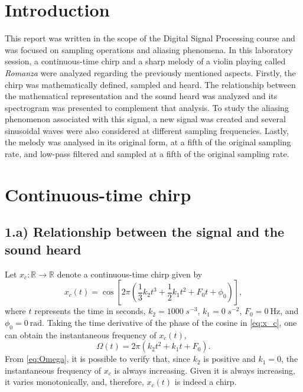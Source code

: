 \documentclass[a4paper, oneside, 11pt]{article}
\begin{document}
\newpage
{}
\setcounter{page}{1}

\section{Introduction}

This report was written in the scope of the Digital Signal Processing course and was focused on sampling operations and aliasing phenomena. In this laboratory session, a continuous-time chirp and a sharp melody of a violin playing called \textit{Romanza} were analyzed regarding the previously mentioned aspects. Firstly, the chirp was mathematically defined, sampled and heard. The relationship between the mathematical representation and the sound heard was analyzed and its spectrogram was presented to complement that analysis. To study the aliasing phenomenon associated with this signal, a new signal was created and several sinusoidal waves were also considered at different sampling frequencies. Lastly, the melody was analysed in its original form, at a fifth of the original sampling rate, and low-pass filtered and sampled at a fifth of the original sampling rate.

\section{Continuous-time chirp}

\subsection{1.a) Relationship between the signal and the sound heard}

Let $x_c: \mathbb{R} \rightarrow \mathbb{R}$ denote a continuous-time chirp given by
\begin{equation} \label{eq:x_c}
    x_c (t) = \cos \left [ 2 \pi \left ( \frac{1}{3} k_2 t^3 + \frac{1}{2} k_1 t^2 + F_0 t + \phi_0 \right) \right],
\end{equation}
where $t$ represents the time in seconds, $k_2 = 1000 \; s^{-3}$, $k_1 = 0 \; s^{-2}$, $F_0 = \SI{0}{\hertz}$, and $\phi_0 = \SI{0}{\radian}$. Taking the time derivative of the phase of the cosine in \eqref{eq:x_c}, one can obtain the instantaneous frequency of $x_c (t)$,
\begin{equation} \label{eq:Omega}
    \Omega (t) = 2 \pi \left (k_2 t^2 + k_1 t + F_0 \right).
\end{equation}
From \eqref{eq:Omega}, it is possible to verify that, since $k_2$ is positive and $k_1 = 0$, the instantaneous frequency of $x_c$ is always increasing. Given it is always increasing, it varies monotonically, and, therefore, $x_c (t)$ is indeed a chirp.
\end{document}
